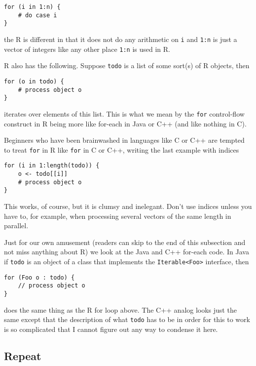 \documentclass[
]{article}
\begin{document}
\begin{verbatim}
for (i in 1:n) {
    # do case i
}
\end{verbatim}

the R is different in that it does not do any arithmetic on \texttt{i}
and \texttt{1:n} is just a vector of integers like any other place
\texttt{1:n} is used in R.

R also has the following. Suppose \texttt{todo} is a list of some
sort(s) of R objects, then

\begin{verbatim}
for (o in todo) {
    # process object o
}
\end{verbatim}

iterates over elements of this list. This is what we mean by the
\texttt{for} control-flow construct in R being more like for-each in
Java or C++ (and like nothing in C).

Beginners who have been brainwashed in languages like C or C++ are
tempted to treat \texttt{for} in R like \texttt{for} in C or C++,
writing the last example with indices

\begin{verbatim}
for (i in 1:length(todo)) {
    o <- todo[[i]]
    # process object o
}
\end{verbatim}

This works, of course, but it is clumsy and inelegant. Don't use indices
unless you have to, for example, when processing several vectors of the
same length in parallel.

Just for our own amusement (readers can skip to the end of this
subsection and not miss anything about R) we look at the Java and C++
for-each code. In Java if \texttt{todo} is an object of a class that
implements the \texttt{Iterable\textless{}Foo\textgreater{}} interface,
then

\begin{verbatim}
for (Foo o : todo) {
    // process object o
}
\end{verbatim}

does the same thing as the R for loop above. The C++ analog looks just
the same except that the description of what \texttt{todo} has to be in
order for this to work is so complicated that I cannot figure out any
way to condense it here.

\hypertarget{repeat}{%
\subsection{Repeat}\label{repeat}}
\end{document}
